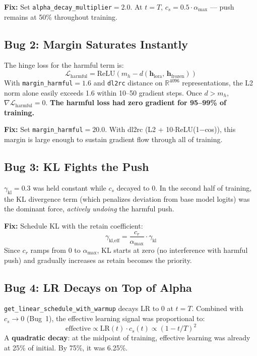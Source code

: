 \documentclass[11pt]{article}
\begin{document}
\textbf{Fix:} Set \texttt{alpha\_decay\_multiplier}$=2.0$. At $t = T$,
$c_s = 0.5 \cdot \alpha_{\max}$ --- push remains at 50\% throughout training.

\subsection{Bug 2: Margin Saturates Instantly}

The hinge loss for the harmful term is:
\begin{equation}
  \mathcal{L}_{\text{harmful}} = \mathrm{ReLU}\!\left(m_h - d(\mathbf{h}_{\text{lora}},\, \mathbf{h}_{\text{frozen}})\right)
\end{equation}
With \texttt{margin\_harmful}$=1.6$ and \texttt{dl2rc} distance on
$\mathbb{R}^{4096}$ representations, the L2 norm alone easily exceeds 1.6
within 10--50 gradient steps. Once $d > m_h$, $\nabla \mathcal{L}_{\text{harmful}} = 0$.
\textbf{The harmful loss had zero gradient for 95--99\% of training.}

\textbf{Fix:} Set \texttt{margin\_harmful}$=20.0$. With dl2rc (L2 + 10$\cdot$ReLU(1$-$cos)),
this margin is large enough to sustain gradient flow through all of training.

\subsection{Bug 3: KL Fights the Push}

$\gamma_\mathrm{kl} = 0.3$ was held constant while $c_s$ decayed to 0. In the
second half of training, the KL divergence term (which penalizes deviation from
base model logits) was the dominant force, \emph{actively undoing} the harmful push.

\textbf{Fix:} Schedule KL with the retain coefficient:
\begin{equation}
  \gamma_{\text{kl,eff}} = \frac{c_r}{\alpha_{\max}} \cdot \gamma_\mathrm{kl}
\end{equation}
Since $c_r$ ramps from 0 to $\alpha_{\max}$, KL starts at zero (no interference
with harmful push) and gradually increases as retain becomes the priority.

\subsection{Bug 4: LR Decays on Top of Alpha}

\texttt{get\_linear\_schedule\_with\_warmup} decays LR to 0 at $t = T$.
Combined with $c_s \to 0$ (Bug~1), the effective learning signal was
proportional to:
\begin{equation}
  \text{effective} \propto \mathrm{LR}(t) \cdot c_s(t) \propto (1-t/T)^2
\end{equation}
A \textbf{quadratic decay}: at the midpoint of training, effective learning was
already at 25\% of initial. By 75\%, it was 6.25\%.
\end{document}
